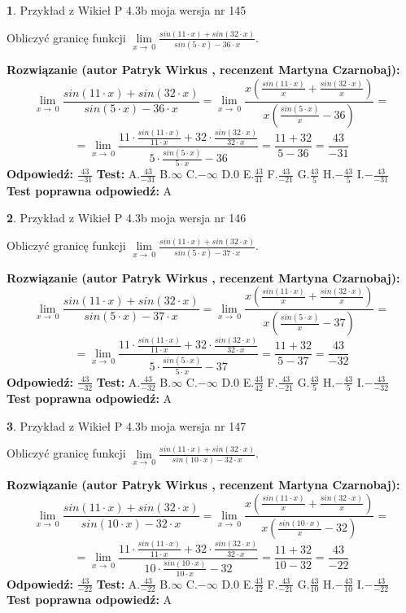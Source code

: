 \documentclass[12pt, a4paper]{article}
\theoremstyle{definition} %
\newtheorem{zad}{}
\newcommand{\zadStart}[1]{\begin{zad}#1\newline}
\newcommand{\zadStop}{\end{zad}}
\newcommand{\rozwStart}[2]{\noindent \textbf{Rozwiązanie (autor #1 , recenzent #2): }\newline}
\newcommand{\rozwStop}{\newline}
\newcommand{\odpStart}{\noindent \textbf{Odpowiedź:}\newline}
\newcommand{\odpStop}{\newline}
\newcommand{\testStart}{\noindent \textbf{Test:}\newline}
\newcommand{\testStop}{\newline}
\newcommand{\kluczStart}{\noindent \textbf{Test poprawna odpowiedź:}\newline}
\newcommand{\kluczStop}{\newline}
\begin{document}
\zadStart{Przykład z Wikieł P 4.3b moja wersja nr 145}


Obliczyć granicę funkcji $\lim\limits_{x\to\ 0}\frac{sin(11 \cdot x)+sin(32 \cdot x)}{sin(5 \cdot x)-36 \cdot x}$.
\zadStop
\rozwStart{Patryk Wirkus}{Martyna Czarnobaj}
$$\lim\limits_{x\to\ 0}\frac{sin(11 \cdot x)+sin(32 \cdot x)}{sin(5 \cdot x)-36 \cdot x}=\lim\limits_{x\to\ 0}\frac{x(\frac{sin(11 \cdot x)}{x}+\frac{sin(32 \cdot x)}{x})}{x(\frac{sin(5 \cdot x)}{x}-36)}=$$
$$=\lim\limits_{x\to\ 0}\frac{11 \cdot \frac{sin(11 \cdot x)}{11 \cdot x}+32 \cdot \frac{sin(32 \cdot x)}{32 \cdot x}}{5 \cdot \frac{sin(5 \cdot x)}{5 \cdot x}-36}=\frac{11+32}{5-36} = \frac{43}{-31}$$
\rozwStop
\odpStart
$\frac{43}{-31}$
\odpStop
\testStart
A.$\frac{43}{-31}$
B.$\infty$
C.$-\infty$
D.$0$
E.$\frac{43}{41}$
F.$\frac{43}{-21}$
G.$\frac{43}{5}$
H.$-\frac{43}{5}$
I.$-\frac{43}{-31}$
\testStop
\kluczStart
A
\kluczStop



\zadStart{Przykład z Wikieł P 4.3b moja wersja nr 146}


Obliczyć granicę funkcji $\lim\limits_{x\to\ 0}\frac{sin(11 \cdot x)+sin(32 \cdot x)}{sin(5 \cdot x)-37 \cdot x}$.
\zadStop
\rozwStart{Patryk Wirkus}{Martyna Czarnobaj}
$$\lim\limits_{x\to\ 0}\frac{sin(11 \cdot x)+sin(32 \cdot x)}{sin(5 \cdot x)-37 \cdot x}=\lim\limits_{x\to\ 0}\frac{x(\frac{sin(11 \cdot x)}{x}+\frac{sin(32 \cdot x)}{x})}{x(\frac{sin(5 \cdot x)}{x}-37)}=$$
$$=\lim\limits_{x\to\ 0}\frac{11 \cdot \frac{sin(11 \cdot x)}{11 \cdot x}+32 \cdot \frac{sin(32 \cdot x)}{32 \cdot x}}{5 \cdot \frac{sin(5 \cdot x)}{5 \cdot x}-37}=\frac{11+32}{5-37} = \frac{43}{-32}$$
\rozwStop
\odpStart
$\frac{43}{-32}$
\odpStop
\testStart
A.$\frac{43}{-32}$
B.$\infty$
C.$-\infty$
D.$0$
E.$\frac{43}{42}$
F.$\frac{43}{-21}$
G.$\frac{43}{5}$
H.$-\frac{43}{5}$
I.$-\frac{43}{-32}$
\testStop
\kluczStart
A
\kluczStop



\zadStart{Przykład z Wikieł P 4.3b moja wersja nr 147}


Obliczyć granicę funkcji $\lim\limits_{x\to\ 0}\frac{sin(11 \cdot x)+sin(32 \cdot x)}{sin(10 \cdot x)-32 \cdot x}$.
\zadStop
\rozwStart{Patryk Wirkus}{Martyna Czarnobaj}
$$\lim\limits_{x\to\ 0}\frac{sin(11 \cdot x)+sin(32 \cdot x)}{sin(10 \cdot x)-32 \cdot x}=\lim\limits_{x\to\ 0}\frac{x(\frac{sin(11 \cdot x)}{x}+\frac{sin(32 \cdot x)}{x})}{x(\frac{sin(10 \cdot x)}{x}-32)}=$$
$$=\lim\limits_{x\to\ 0}\frac{11 \cdot \frac{sin(11 \cdot x)}{11 \cdot x}+32 \cdot \frac{sin(32 \cdot x)}{32 \cdot x}}{10 \cdot \frac{sin(10 \cdot x)}{10 \cdot x}-32}=\frac{11+32}{10-32} = \frac{43}{-22}$$
\rozwStop
\odpStart
$\frac{43}{-22}$
\odpStop
\testStart
A.$\frac{43}{-22}$
B.$\infty$
C.$-\infty$
D.$0$
E.$\frac{43}{42}$
F.$\frac{43}{-21}$
G.$\frac{43}{10}$
H.$-\frac{43}{10}$
I.$-\frac{43}{-22}$
\testStop
\kluczStart
A
\kluczStop
\end{document}
